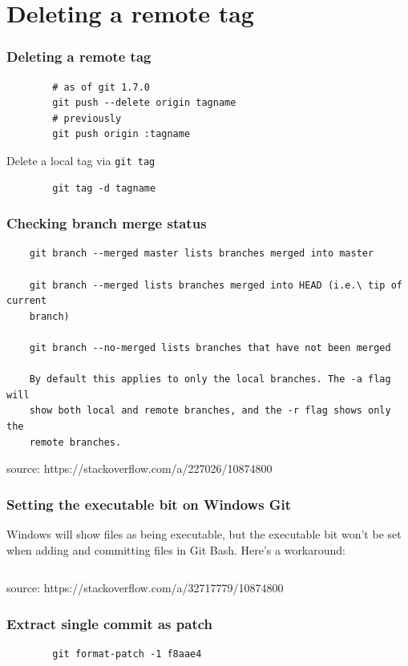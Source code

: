 \documentclass{git_course}
\begin{document}
\section{Deleting a remote tag}

\begin{frame}[fragile]
\frametitle{Deleting a remote tag}

    \begin{verbatim}
        # as of git 1.7.0
        git push --delete origin tagname
        # previously
        git push origin :tagname
    \end{verbatim}
\end{frame}

\begin{frame}[fragile]{Delete a local tag via \texttt{git tag}}
    \begin{verbatim}
        git tag -d tagname
    \end{verbatim}
\end{frame}

\begin{frame}[fragile]
\frametitle{Checking branch merge status}
    \begin{verbatim}
    git branch --merged master lists branches merged into master

    git branch --merged lists branches merged into HEAD (i.e.\ tip of current
    branch)

    git branch --no-merged lists branches that have not been merged

    By default this applies to only the local branches. The -a flag will
    show both local and remote branches, and the -r flag shows only the
    remote branches.
    \end{verbatim}
    source: https://stackoverflow.com/a/227026/10874800
\end{frame}

\begin{frame}[fragile]
\frametitle{Setting the executable bit on Windows Git}
Windows will show files as being executable, but the executable bit won't be
set when adding and committing files in Git Bash.  Here's a workaround:

    \inputminted{bash}{set-executable-bit-on-windows-git.txt}
    source: https://stackoverflow.com/a/32717779/10874800
\end{frame}

\begin{frame}[fragile]
\frametitle{Extract single commit as patch}
    \begin{verbatim}
        git format-patch -1 f8aae4
    \end{verbatim}
\end{frame}
\end{document}
